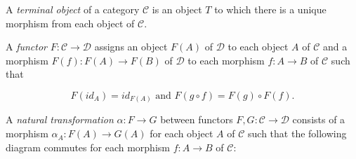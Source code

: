\documentclass[ag.tex]{subfiles}
\begin{document}
\begin{definition}\label{terminal object}
A \textit{terminal object} of a category $\mathcal{C}$ is an object $T$ to which there is a unique morphism from each object of $\mathcal{C}$.
\end{definition}

\begin{definition}
A \textit{functor} $F : \mathcal{C} \to \mathcal{D}$ assigns an object $F(A)$ of $\mathcal{D}$ to each object $A$ of $\mathcal{C}$ and a morphism $F(f) : F(A) \to F(B)$ of $\mathcal{D}$ to each morphism $f:A\to B$ of $\mathcal{C}$ such that 

\begin{equation}
F(id_A) = id_{F(A)} \text{ and } F(g \circ f) = F(g) \circ F(f).
\end{equation}

\begin{definition}
A \textit{natural transformation} $\alpha : F \to G$ between functors $F, G: \mathcal{C} \to \mathcal{D}$ consists of a morphism $\alpha_A : F(A) \to G(A)$ for each object $A$ of $\mathcal{C}$ such that the following diagram commutes for each morphism $f : A \to B$ of $\mathcal{C}$:

\begin{center}
\end{center}
\end{definition}

\end{definition}
\end{document}
